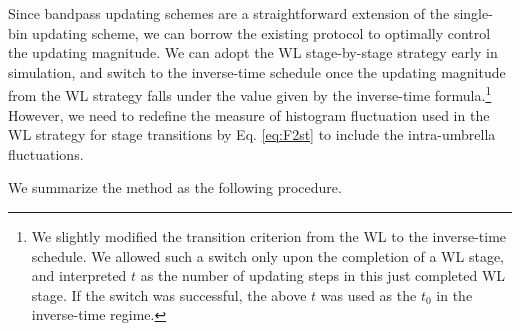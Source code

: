 \documentclass[reprint, superscriptaddress, floatfix]{revtex4-1}
\begin{document}
Since bandpass updating schemes are a straightforward extension
of the single-bin updating scheme,
we can borrow the existing protocol\cite{belardinelli2007,
  *belardinelli2007jcp, *belardinelli2008, *belardinelli2016}
to optimally control the updating magnitude.
%
We can adopt the WL stage-by-stage strategy early in simulation,
and switch to the inverse-time schedule
once the updating magnitude from the WL strategy
falls under the value given by the inverse-time formula.\footnote{We
  slightly modified the transition criterion
  from the WL to the inverse-time schedule.
  We allowed such a switch only
  upon the completion of a WL stage,
  and interpreted $t$ as the number of updating steps
  in this just completed WL stage.
  If the switch was successful,
  the above $t$ was used as the $t_0$
  in the inverse-time regime.}
However, we need to redefine the measure of histogram fluctuation
used in the WL strategy for stage transitions
by Eq. \eqref{eq:F2st}
to include the intra-umbrella fluctuations.
%

We summarize the method as the following procedure.
\end{document}
